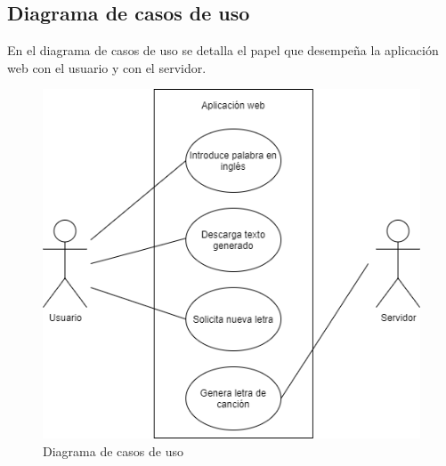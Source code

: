 \documentclass[12pt, a4paper, titlepage]{article}
\begin{document}
	\subsection{Diagrama de casos de uso}
	En el diagrama de casos de uso se detalla el papel que desempeña la aplicación web con el usuario y con el servidor.	
	\begin{figure}[H] 
		\includegraphics[width=13.5cm]{./Imagenes/Diagramas/CasoUso.png}
		\centering \caption{Diagrama de casos de uso}
	\end{figure}
	\newpage
\end{document}
